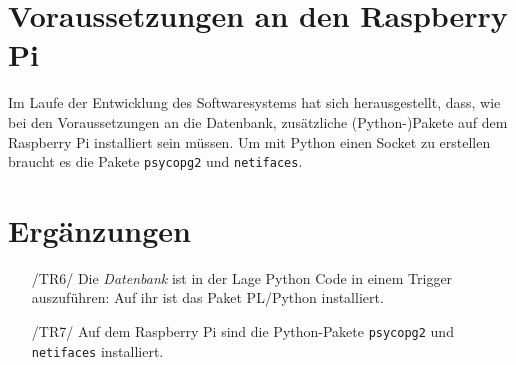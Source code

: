 \documentclass{scrartcl}
\begin{document}
\section{Voraussetzungen an den Raspberry Pi}
Im Laufe der Entwicklung des Softwaresystems hat sich herausgestellt, dass, wie bei den Voraussetzungen an die Datenbank, zusätzliche (Python-)Pakete auf dem Raspberry Pi installiert sein müssen. Um mit Python einen Socket zu erstellen braucht es die Pakete \texttt{psycopg2} und \texttt{netifaces}.

\section{Ergänzungen}
\begin{enumerate}
\item[/TR6/] Die \emph{Datenbank} ist in der Lage Python Code in einem Trigger auszuführen: Auf ihr ist das Paket PL/Python installiert.
\item[/TR7/] Auf dem Raspberry Pi sind die Python-Pakete \texttt{psycopg2} und \texttt{netifaces} installiert.
\end{enumerate}
\end{document}
